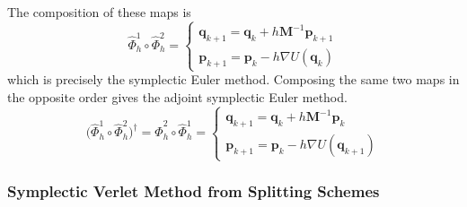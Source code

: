       The composition of these maps is 
      \begin{equation}
        \hat{\Phi}_h^1 \circ \hat{\Phi}_h^2 = \begin{cases} 
        \mathbf{q}_{k+1} = \mathbf{q}_k + h \mathbf{M}^{-1} \mathbf{p}_{k+1} \\
        \mathbf{p}_{k+1} = \mathbf{p}_k - h \nabla U (\mathbf{q}_k) 
        \end{cases}
      \end{equation}
      which is precisely the symplectic Euler method. Composing the same two maps in the opposite order gives the adjoint symplectic Euler method. 
      \begin{equation}
        \big(\hat{\Phi}_h^1 \circ \hat{\Phi}_h^2 \big)^\dagger = \hat{\Phi}_h^2 \circ \hat{\Phi}_h^1 = \begin{cases} 
        \mathbf{q}_{k+1} = \mathbf{q}_k + h \mathbf{M}^{-1} \mathbf{p}_k \\
        \mathbf{p}_{k+1} = \mathbf{p}_k - h \nabla U(\mathbf{q}_{k+1}) 
        \end{cases}
      \end{equation}

    \subsubsection{Symplectic Verlet Method from Splitting Schemes}

